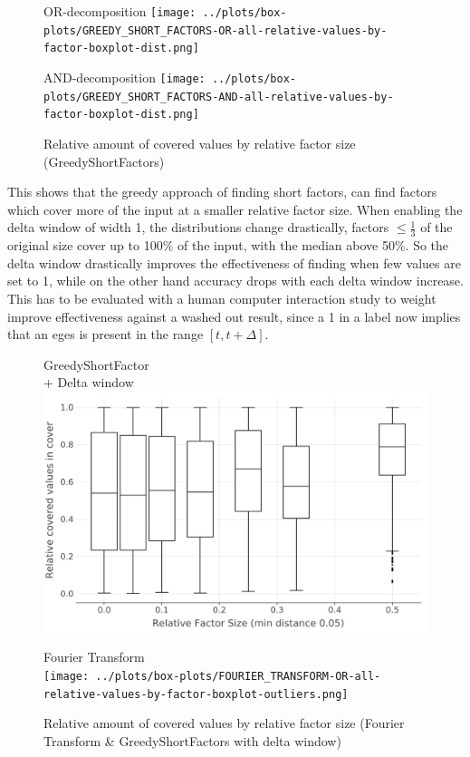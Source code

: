 \begin{figure}[t]
	\begin{minipage}[h]{0.49\linewidth}
		\centering
		OR-decomposition
		\texttt{[image: ../plots/box-plots/GREEDY\_SHORT\_FACTORS-OR-all-relative-values-by-factor-boxplot-dist.png]}
	\end{minipage}
	\begin{minipage}[h]{0.49\linewidth}
		\centering
		AND-decomposition
		\texttt{[image: ../plots/box-plots/GREEDY\_SHORT\_FACTORS-AND-all-relative-values-by-factor-boxplot-dist.png]}
	\end{minipage}
	\caption{Relative amount of covered values by relative factor size (GreedyShortFactors)}
	\label{fig:eval:greedy-short-factors-all-factors-box-plot}
\end{figure}
This shows that the greedy approach of finding short factors, can find factors which cover more of the input at a smaller relative factor size.
When enabling the delta window of width 1, the distributions change drastically, factors $\leq \frac{1}{3}$ of the original size cover up to 100\% of the input, with the median above 50\%.
So the delta window drastically improves the effectiveness of finding \orDecomp when few values are set to 1, while on the other hand accuracy drops with each delta window increase.
This has to be evaluated with a human computer interaction study to weight improve effectiveness against a washed out result, since a 1 in a label now implies that an eges is present in the range  $[t, t + \Delta]$.
\begin{figure}[b]
	\begin{minipage}[h]{0.49\linewidth}
		\centering
		GreedyShortFactor\\
		+ Delta window
		\includegraphics[width=\linewidth]{../delta-plots/box-plots/GREEDY_SHORT_FACTORS-OR-all-relative-values-by-factor-boxplot-dist.png}
	\end{minipage}
	\begin{minipage}[h]{0.49\linewidth}
		\centering
		Fourier Transform\\
		\hfill \break
		\texttt{[image: ../plots/box-plots/FOURIER\_TRANSFORM-OR-all-relative-values-by-factor-boxplot-outliers.png]}
	\end{minipage}
	\caption{Relative amount of covered values by relative factor size (Fourier Transform \& GreedyShortFactors with delta window)}
	\label{fig:eval:greedy-short-factors-all-factors-box-plot-delta}
\end{figure}

